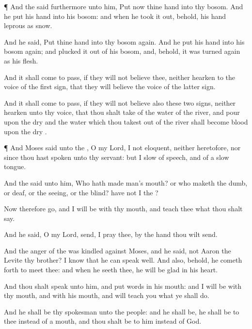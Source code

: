 {\par }{\PP {}¶ And the
{}
said
furthermore unto him,
Put now thine
hand into thy
bosom. And he
put his
hand into his
bosom: and when he
took it out, behold, his
hand
{}
leprous as
snow.

And he
said,
Put thine
hand into thy
bosom
again. And he
put his
hand into his
bosom
again; and
plucked it out of his
bosom, and, behold, it was turned
again as his
{}
flesh.

And it shall come to pass, if they will not
believe thee, neither
hearken to the
voice of the
first
sign, that they will
believe the
voice of the
latter
sign.

And it shall come to pass, if they will not
believe also these
two
signs, neither
hearken unto thy
voice, that thou shalt
take of the
water of the
river, and
pour
{} upon the
dry
{} and the
water which thou
takest out of the
river shall become
blood upon the
dry
{}.


\par }{\PP {}¶ And
Moses
said unto the
{},
O my
Lord,
I
{} not
eloquent, neither
heretofore, nor
since thou hast
spoken unto thy
servant: but I
{}
slow of
speech, and of a
slow
tongue.

And the
{}
said unto him, Who hath
made
man’s
mouth? or who
maketh the
dumb, or
deaf, or the
seeing, or the
blind? have not I the
{}?

Now therefore
go, and I will be with thy
mouth, and
teach thee what thou shalt
say.

And he
said,
O my
Lord,
send, I pray thee, by the
hand
{} thou wilt
send.

And the
anger of the
{} was
kindled against
Moses, and he
said,
{} not
Aaron the
Levite thy
brother? I
know that he can
speak
well. And also, behold, he cometh
forth to
meet thee: and when he
seeth thee, he will be
glad in his
heart.

And thou shalt
speak unto him, and
put
words in his
mouth: and I will be with thy
mouth, and with his
mouth, and will
teach you what ye shall
do.

And he shall be thy
spokesman unto the
people: and he shall be,
{} he shall be to thee instead of a
mouth, and thou shalt be to him instead of
God.

}
